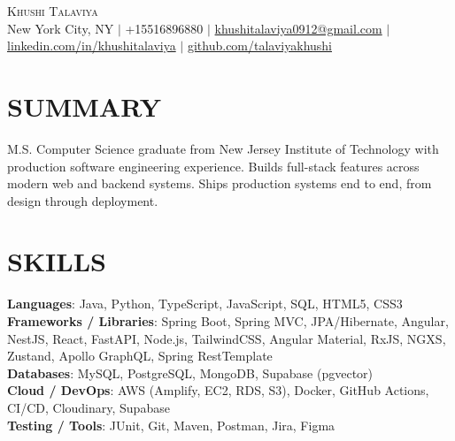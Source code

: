 \documentclass[letterpaper,11pt]{article}
\begin{document}
\begin{center}
    {\Huge \scshape Khushi Talaviya} \\ \vspace{2pt}
    \vspace{4pt}
    \small
    New York City, NY $|$
    \small
    +15516896880 $|$
    \href{mailto:khushitalaviya0912@gmail.com}{khushitalaviya0912@gmail.com} $|$
    \href{https://www.linkedin.com/in/khushitalaviya/}{linkedin.com/in/khushitalaviya} $|$
    \href{https://github.com/talaviyakhushi}{github.com/talaviyakhushi}
\end{center}

\section{SUMMARY}
\vspace{5pt}
\small{M.S. Computer Science graduate from New Jersey Institute of Technology with production software engineering experience. Builds full-stack features across modern web and backend systems. Ships production systems end to end, from design through deployment.}

\vspace{2pt}
\section{SKILLS}
\vspace{5pt}
\begin{itemize}[leftmargin=0in, label={}]
\small{\item{
\textbf{Languages}{: Java, Python, TypeScript, JavaScript, SQL, HTML5, CSS3} \\
\textbf{Frameworks / Libraries}{: Spring Boot, Spring MVC, JPA/Hibernate, Angular, NestJS, React, FastAPI, Node.js, TailwindCSS, Angular Material, RxJS, NGXS, Zustand, Apollo GraphQL, Spring RestTemplate} \\
\textbf{Databases}{: MySQL, PostgreSQL, MongoDB, Supabase (pgvector)} \\
\textbf{Cloud / DevOps}{: AWS (Amplify, EC2, RDS, S3), Docker, GitHub Actions, CI/CD, Cloudinary, Supabase} \\
\textbf{Testing / Tools}{: JUnit, Git, Maven, Postman, Jira, Figma}
}}
\end{itemize}
\vspace{-10pt}

\end{document}
